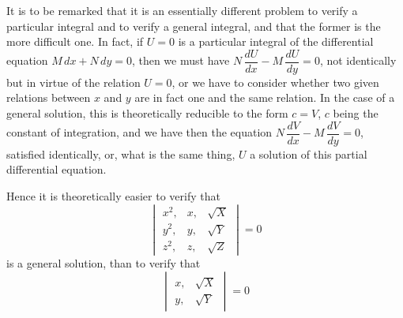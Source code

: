 \documentclass[11pt]{article}
\begin{document}
It is to be remarked that it is an essentially different problem to verify a particular integral and to verify a general integral, and that the former is the more difficult one. In fact, if $U = 0$ is a particular integral of the differential equation $M\,dx + N\,dy = 0$, then we must have $N\,\dfrac{dU}{dx} - M\,\dfrac{dU}{dy} = 0$, not identically but in virtue of the relation $U = 0$, or we have to consider whether two given relations between $x$ and $y$ are in fact one and the same relation. In the case of a general solution, this is theoretically reducible to the form $c = V$, $c$ being the constant of integration, and we have then the equation $N\,\dfrac{dV}{dx} - M\,\dfrac{dV}{dy} = 0$, satisfied identically, or, what is the same thing, $U$ a solution of this partial differential equation.

Hence it is theoretically easier to verify that
\[
\begin{vmatrix} x^2,& x,& \sqrt{X}\\ y^2,& y,& \sqrt{Y}\\ z^2,& z,& \sqrt{Z} \end{vmatrix} = 0
\]
is a general solution, than to verify that
\[
\begin{vmatrix} x,& \sqrt{X}\\ y,& \sqrt{Y} \end{vmatrix} = 0
\]
\end{document}
